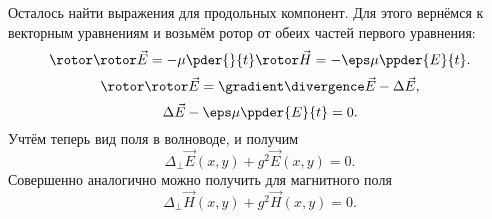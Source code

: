     Осталось найти выражения для продольных компонент. Для этого вернёмся к
    векторным уравнениям и возьмём ротор от обеих частей первого уравнения:
    \[
        \rotor\rotor\vec{E} = -\mu \pder{}{t}\rotor\vec{H} =
        -\eps\mu\ppder{E}{t}.
    \]
    \[
        \rotor\rotor\vec{E} = \gradient\divergence\vec{E} - \Delta\vec{E},
    \]
    \[
        \Delta\vec{E} - \eps\mu\ppder{E}{t} = 0.
    \]
    Учтём теперь вид поля в волноводе, и получим
    \[
        \Delta_\perp \vec{E}(x,y) + g^2\vec{E}(x,y) = 0.
    \]
    Совершенно аналогично можно получить для магнитного поля
    \[
        \Delta_\perp \vec{H}(x,y) + g^2\vec{H}(x,y) = 0.
    \]